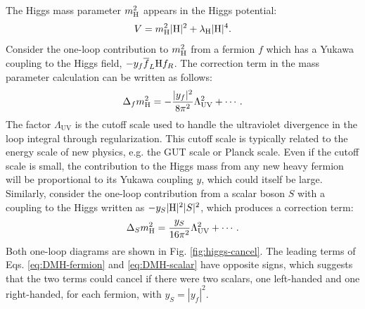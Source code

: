 The Higgs mass parameter $m_{\mathrm{H}}^{2}$ appears in the Higgs potential:
\begin{equation}
V = m_{\mathrm{H}}^{2}|\mathrm{H}|^{2} + \lambda_{\mathrm{H}}|\mathrm{H}|^{4}.
\end{equation}
Consider the one-loop contribution to $m_{\mathrm{H}}^{2}$ from a fermion $f$ which has a Yukawa coupling to the Higgs field, $-y_{f} \overline{f}_{L} \mathrm{H} f_{R}$. The correction term in the mass parameter calculation can be written as follows:
\begin{equation}
\Delta_{f} m_{\mathrm{H}}^{2} = -\frac{|y_{f}|^{2}}{8\pi^{2}}\Lambda_{\text{UV}}^{2} + \cdots. \label{eq:DMH-fermion}
\end{equation}
The factor $\Lambda_{\text{UV}}$ is the cutoff scale used to handle the ultraviolet divergence in the loop integral through regularization. This cutoff scale is typically related to the energy scale of new physics, e.g. the GUT scale or Planck scale. Even if the cutoff scale is small, the contribution to the Higgs mass from any new heavy fermion will be proportional to its Yukawa coupling $y$, which could itself be large. Similarly, consider the one-loop contribution from a scalar boson $S$ with a coupling to the Higgs written as $-y_{S} |\mathrm{H}|^{2} |S|^{2}$, which produces a correction term:
\begin{equation}
\Delta_{S} m_{\mathrm{H}}^{2} = \frac{y_{S}}{16\pi^{2}}\Lambda_{\text{UV}}^{2} + \cdots. \label{eq:DMH-scalar}
\end{equation}
Both one-loop diagrams are shown in Fig. \ref{fig:higgs-cancel}. The leading terms of Eqs. \eqref{eq:DMH-fermion} and \eqref{eq:DMH-scalar} have opposite signs, which suggests that the two terms could cancel if there were two scalars, one left-handed and one right-handed, for each fermion, with $y_{S} = |y_{f}|^2$.

